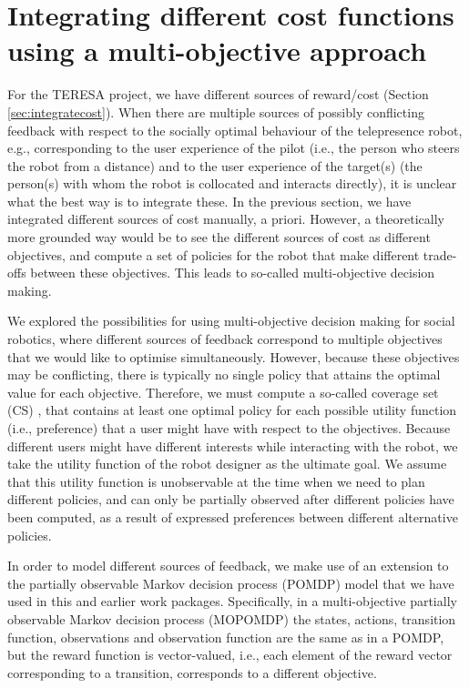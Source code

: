 \documentclass[a4paper,11pt]{report}
\begin{document}
\section{Integrating different cost functions using a multi-objective approach}
For the TERESA project, we have different sources of reward/cost (Section \ref{sec:integratecost}). When there are multiple sources of possibly conflicting feedback with respect to the socially optimal behaviour of the telepresence robot, e.g.,  corresponding to the user experience of the pilot (i.e., the person who steers the robot from a distance) and to the user experience of the target(s) (the person(s) with whom the robot is collocated and interacts directly), it is unclear what the best way is to integrate these. In the previous section, we have integrated different sources of cost manually, a priori. However, a theoretically more grounded way would be to see the different sources of cost as different objectives, and compute a set of policies for the robot that make different trade-offs between these objectives. This leads to so-called multi-objective decision making. 

We explored the possibilities for using multi-objective decision making \cite{roijers13survey, roijersPhD} for social robotics,  where different sources of feedback correspond to multiple objectives that we would like to optimise simultaneously. However, because these objectives may be conflicting, there is typically no single policy that attains the optimal value for each objective. Therefore, we must compute a so-called coverage set (CS) \cite{roijers13survey}, that contains at least one optimal policy for each possible utility function (i.e., preference) that a user might have with respect to the objectives. Because different users might have different interests while interacting with the robot, we take the utility function of the robot designer as the ultimate goal. We assume that this utility function is unobservable at the time when we need to plan different policies, and can only be partially observed after different policies have been computed, as a result of expressed preferences between different alternative policies.

In order to model different sources of feedback, we make use of an extension to the partially observable Markov decision process (POMDP) model \cite{Kaelbling98} that we have used in this and earlier work packages. Specifically, in a multi-objective partially observable Markov decision process (MOPOMDP) \cite{soh2011,roijers2015point,wray2015} the states, actions, transition function, observations and observation function are the same as in a POMDP, but the reward function is vector-valued, i.e., each element of the reward vector corresponding to a transition, corresponds to a different objective. 
\end{document}
